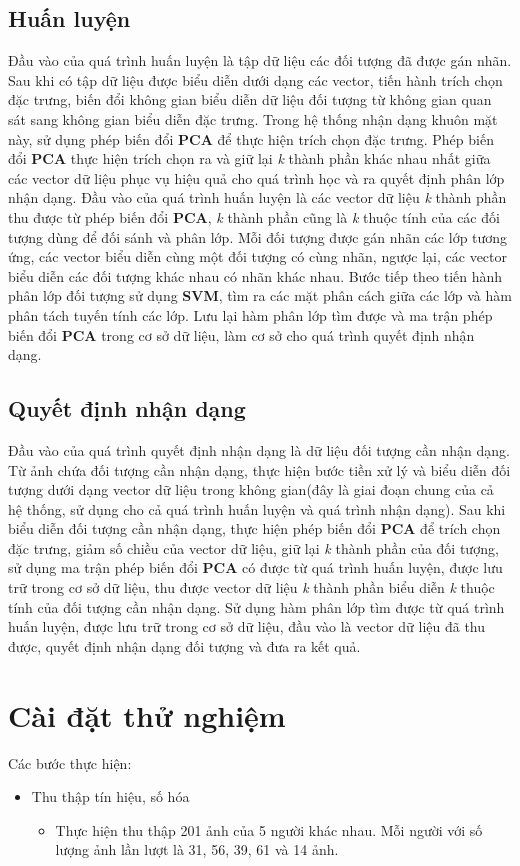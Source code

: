 \documentclass[12pt,a4paper]{article}
\begin{document}
\subsection{Huấn luyện}
Đầu vào của quá trình huấn luyện là tập dữ liệu các đối tượng đã được gán nhãn. Sau khi có tập dữ liệu được biểu diễn dưới dạng các vector, tiến hành trích chọn đặc trưng, biến đổi không gian biểu diễn dữ liệu đối tượng từ không gian quan sát sang không gian biểu diễn đặc trưng. Trong hệ thống nhận dạng khuôn mặt này, sử dụng phép biến đổi \textbf{PCA} để thực hiện trích chọn đặc trưng. Phép biến đổi \textbf{PCA} thực hiện trích chọn ra và giữ lại \textit{k} thành phần khác nhau nhất giữa các vector dữ liệu phục vụ hiệu quả cho quá trình học và ra quyết định phân lớp nhận dạng. Đầu vào của quá trình huấn luyện là các vector dữ liệu \textit{k} thành phần thu được từ phép biến đổi \textbf{PCA}, \textit{k} thành phần cũng là \textit{k} thuộc tính của các đối tượng dùng để đối sánh và phân lớp. Mỗi đối tượng được gán nhãn các lớp tương ứng, các vector biểu diễn cùng một đối tượng có cùng nhãn, ngược lại, các vector biểu diễn các đối tượng khác nhau có nhãn khác nhau. Bước tiếp theo tiến hành phân lớp đối tượng sử dụng \textbf{SVM}, tìm ra các mặt phân cách giữa các lớp và hàm phân tách tuyến tính các lớp. Lưu lại hàm phân lớp tìm được và ma trận phép biến đổi \textbf{PCA} trong cơ sở dữ liệu, làm cơ sở cho quá trình quyết định nhận dạng. 
\subsection{Quyết định nhận dạng} 
Đầu vào của quá trình quyết định nhận dạng là dữ liệu đối tượng cần nhận dạng. Từ ảnh chứa đối tượng cần nhận dạng, thực hiện bước tiền xử lý và biểu diễn đối tượng dưới dạng vector dữ liệu trong không gian(đây là giai đoạn chung của cả hệ thống, sử dụng cho cả quá trình huấn luyện và quá trình nhận dạng). Sau khi biểu diễn đối tượng cần nhận dạng, thực hiện phép biến đổi \textbf{PCA} để trích chọn đặc trưng, giảm số chiều của vector dữ liệu, giữ lại \textit{k} thành phần của đối tượng, sử dụng ma trận phép biến đổi \textbf{PCA} có được từ quá trình huấn luyện, được lưu trữ trong cơ sở dữ liệu, thu được vector dữ liệu \textit{k} thành phần biểu diễn \textit{k} thuộc tính của đối tượng cần nhận dạng.
Sử dụng hàm phân lớp tìm được từ quá trình huấn luyện, được lưu trữ trong cơ sở dữ liệu, đầu vào là vector dữ liệu đã thu được, quyết định nhận dạng đối tượng và đưa ra kết quả. 

\section{Cài đặt thử nghiệm}
Các bước thực hiện: 
\begin{itemize}
\item Thu thập tín hiệu, số hóa 
\begin{itemize}
\item Thực hiện thu thập 201 ảnh của 5 người khác nhau. Mỗi người với số lượng ảnh lần lượt là 31, 56, 39, 61 và 14 ảnh. 
\end{itemize}
\end{itemize}    
\end{document}
